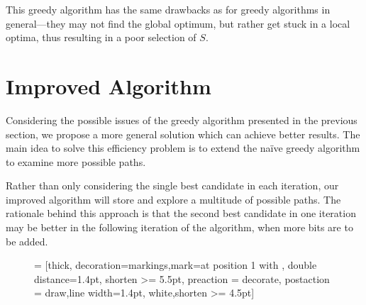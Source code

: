 {This greedy algorithm has the same drawbacks as for greedy algorithms in general---they may not find the global optimum, but rather get stuck in a local optima, thus resulting in a poor selection of $S$.

\section{Improved Algorithm} \label{sec:improvedalg}

Considering the possible issues of the greedy algorithm presented in the previous section, we propose a more general solution which can achieve better results. The main idea to solve this efficiency problem is to extend the na\"{i}ve greedy algorithm to examine more possible paths.

Rather than only considering the single best candidate in each iteration, our improved algorithm will store and explore a multitude of possible paths.
The rationale behind this approach is that the second best candidate in one iteration may be better in the following iteration of the algorithm, when more bits are to be added.

\begin{figure}[t]
	\begin{center}
		 = [thick, decoration={markings,mark=at position
			1 with {}},
		double distance=1.4pt, shorten >= 5.5pt,
		preaction = {decorate},
		postaction = {draw,line width=1.4pt, white,shorten >= 4.5pt}]
\end{center}
\end{figure}}
